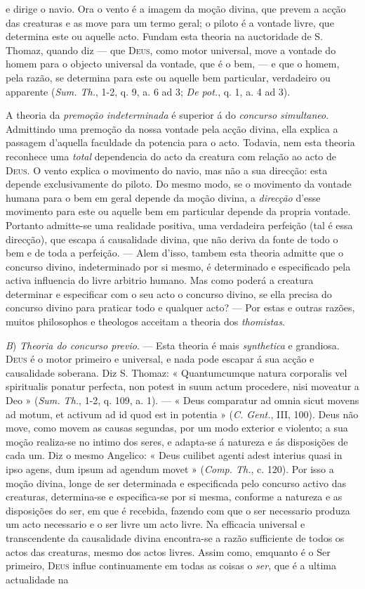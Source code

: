 e dirige o navio. Ora o vento é a imagem da moção divina, que prevem a acção das creaturas e as move para um termo geral; o piloto é a vontade livre, que determina este ou aquelle acto. Fundam esta theoria na auctoridade de S. Thomaz, quando diz --- que \textsc{Deus}, como motor universal, move a vontade do homem para o objecto universal da vontade, que é o bem, --- e que o homem, pela razão, se determina para este ou aquelle bem particular, verdadeiro ou apparente (\emph{Sum. Th.}, 1-2, q. 9, a. 6 ad 3; \emph{De pot.}, q. 1, a. 4 ad 3).\par A theoria da \emph{premoção indeterminada} é superior á do \emph{concurso simultaneo}. Admittindo uma premoção da nossa vontade pela acção divina, ella explica a passagem d'aquella faculdade da potencia para o acto. Todavia, nem esta theoria reconhece uma \emph{total} dependencia do acto da creatura com relação ao acto de \textsc{Deus}. O vento explica o movimento do navio, mas não a sua direcção: esta depende exclusivamente do piloto. Do mesmo modo, se o movimento da vontade humana para o bem em geral depende da moção divina, a \emph{direcção} d'esse movimento para este ou aquelle bem em particular depende da propria vontade. Portanto admitte-se uma realidade positiva, uma verdadeira perfeição (tal é essa direcção), que escapa á causalidade divina, que não deriva da fonte de todo o bem e de toda a perfeição. --- Alem d'isso, tambem esta theoria admitte que o concurso divino, indeterminado por si mesmo, é determinado e especificado pela activa influencia do livre arbitrio humano. Mas como poderá a creatura determinar e especificar com o seu acto o concurso divino, se ella precisa do concurso divino para praticar todo e qualquer acto? --- Por estas e outras razões, muitos philosophos e theologos acceitam a theoria dos \emph{thomistas}.\par \emph{B}) \emph{Theoria do concurso previo}. --- Esta theoria é mais \emph{synthetica} e grandiosa. \textsc{Deus} é o motor primeiro e universal, e nada pode escapar á sua acção e causalidade soberana. Diz S. Thomaz: « Quantumcumque natura corporalis vel spiritualis ponatur perfecta, non potest in suum actum procedere, nisi moveatur a Deo » (\emph{Sum. Th.}, 1-2, q. 109, a. 1). --- « Deus comparatur ad omnia sicut movens ad motum, et activum ad id quod est in potentia » (\emph{C. Gent.}, III, 100). Deus não move, como movem as causas segundas, por um modo exterior e violento; a sua moção realiza-se no intimo dos seres, e adapta-se á natureza e ás disposições de cada um. Diz o mesmo Angelico: « Deus cuilibet agenti adest interius quasi in ipso agens, dum ipsum ad agendum movet » (\emph{Comp. Th.}, c. 120). Por isso a moção divina, longe de ser determinada e especificada pelo concurso activo das creaturas, determina-se e especifica-se por si mesma, conforme a natureza e as disposições do ser, em que é recebida, fazendo com que o ser necessario produza um acto necessario e o ser livre um acto livre. Na efficacia universal e transcendente da causalidade divina encontra-se a razão sufficiente de todos os actos das creaturas, mesmo dos actos livres. Assim como, emquanto é o Ser primeiro, \textsc{Deus} influe continuamente em todas as coisas o \emph{ser}, que é a ultima actualidade na 
